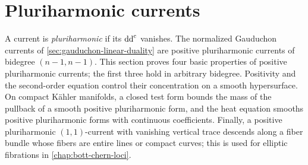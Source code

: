 \section{Pluriharmonic currents}
\label{sec:horizontal-pluriharmonic-currents}

A current is \emph{pluriharmonic} if its $\mathrm{dd}^{\mathrm{c}}$ vanishes. The normalized Gauduchon currents of \cref{sec:gauduchon-linear-duality} are positive pluriharmonic currents of bidegree $(n-1,n-1)$. This section proves four basic properties of positive pluriharmonic currents; the first three hold in arbitrary bidegree. Positivity and the second-order equation control their concentration on a smooth hypersurface. On compact K\"ahler manifolds, a closed test form bounds the mass of the pullback of a smooth positive pluriharmonic form, and the heat equation smooths positive pluriharmonic forms with continuous coefficients. Finally, a positive pluriharmonic $(1,1)$-current with vanishing vertical trace descends along a fiber bundle whose fibers are entire lines or compact curves; this is used for elliptic fibrations in \cref{chap:bott-chern-loci}.

